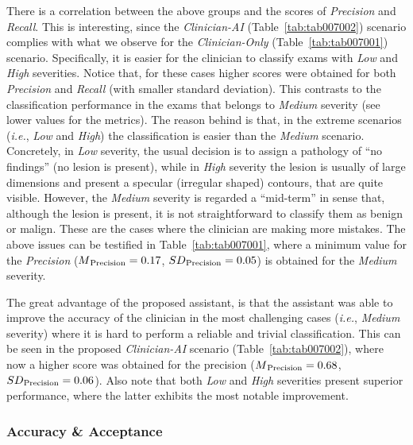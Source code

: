 There is a correlation between the above groups and the scores of {\it Precision} and {\it Recall}.
This is interesting, since the {\it Clinician-AI} (Table~\ref{tab:tab007002}) scenario complies with what we observe for the {\it Clinician-Only} (Table~\ref{tab:tab007001}) scenario.
Specifically, it is easier for the clinician to classify exams with {\it Low} and {\it High} severities. Notice that, for these cases higher scores were obtained for both {\it Precision} and {\it Recall} (with smaller standard deviation).
This contrasts to the classification performance in the exams that belongs to {\it Medium} severity (see lower values for the metrics).
The reason behind is that, in the  extreme scenarios ({\it i.e.}, {\it Low} and {\it High}) the classification is easier than the {\it Medium} scenario.
Concretely, in {\it Low} severity, the usual decision is to assign a pathology of ``no findings'' (no lesion is present), while in {\it High} severity the lesion is usually of large dimensions and present a specular (irregular shaped) contours, that are quite visible.
However, the {\it Medium} severity is regarded a ``mid-term'' in sense that, although the lesion is present, it is not straightforward to classify them as benign or malign.
These are the cases where the clinician are making more mistakes.
The above issues can be testified in Table~\ref{tab:tab007001}, where a minimum value for the {\it Precision} ($M\textsubscript{Precision} = 0.17$, $SD\textsubscript{Precision} = 0.05$) is obtained for the {\it Medium} severity.



The great advantage of the proposed assistant, is that the assistant was able to improve the accuracy of the clinician in the most challenging cases ({\it i.e.}, {\it Medium} severity) where it is hard to perform a reliable and trivial classification.
This can be seen in the proposed {\it Clinician-AI} scenario (Table~\ref{tab:tab007002}), where now a higher score was obtained for the precision ($M\textsubscript{Precision} = 0.68$, $SD\textsubscript{Precision} = 0.06$).
Also note that both {\it Low} and {\it High} severities present superior performance, where the latter exhibits the most notable improvement.

\subsubsection{Accuracy \& Acceptance}
\label{sec:app002004004002}

